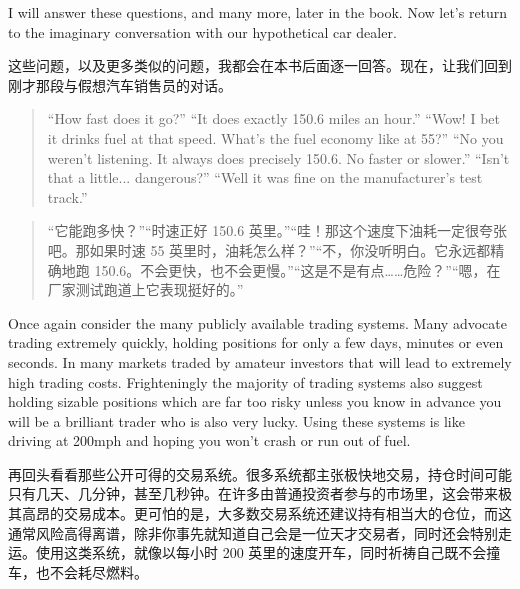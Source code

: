 \begin{englishblock} I will answer these questions, and many more, later in the book. Now let's return to the imaginary conversation with our hypothetical car dealer. \end{englishblock}

\begin{chineseblock}这些问题，以及更多类似的问题，我都会在本书后面逐一回答。现在，让我们回到刚才那段与假想汽车销售员的对话。\end{chineseblock}

\begin{quote}
\begingroup\color{\englishbodycolorname} ``How fast does it go?'' ``It does exactly 150.6 miles an hour.'' ``Wow! I bet it drinks fuel at that speed. What's the fuel economy like at 55?'' ``No you weren't listening. It always does precisely 150.6. No faster or slower.'' ``Isn't that a little... dangerous?'' ``Well it was fine on the manufacturer's test track.'' \endgroup
\end{quote}

\begin{quote}
\begingroup\color{\chinesebodycolorname}“它能跑多快？”“时速正好 150.6 英里。”“哇！那这个速度下油耗一定很夸张吧。那如果时速 55 英里时，油耗怎么样？”“不，你没听明白。它永远都精确地跑 150.6。不会更快，也不会更慢。”“这是不是有点……危险？”“嗯，在厂家测试跑道上它表现挺好的。”\endgroup
\end{quote}

\begin{englishblock} Once again consider the many publicly available trading systems. Many advocate trading extremely quickly, holding positions for only a few days, minutes or even seconds. In many markets traded by amateur investors that will lead to extremely high trading costs. Frighteningly the majority of trading systems also suggest holding sizable positions which are far too risky unless you know in advance you will be a brilliant trader who is also very lucky. Using these systems is like driving at 200mph and hoping you won't crash or run out of fuel. \end{englishblock}

\begin{chineseblock}再回头看看那些公开可得的交易系统。很多系统都主张极快地交易，持仓时间可能只有几天、几分钟，甚至几秒钟。在许多由普通投资者参与的市场里，这会带来极其高昂的交易成本。更可怕的是，大多数交易系统还建议持有相当大的仓位，而这通常风险高得离谱，除非你事先就知道自己会是一位天才交易者，同时还会特别走运。使用这类系统，就像以每小时 200 英里的速度开车，同时祈祷自己既不会撞车，也不会耗尽燃料。\end{chineseblock}


